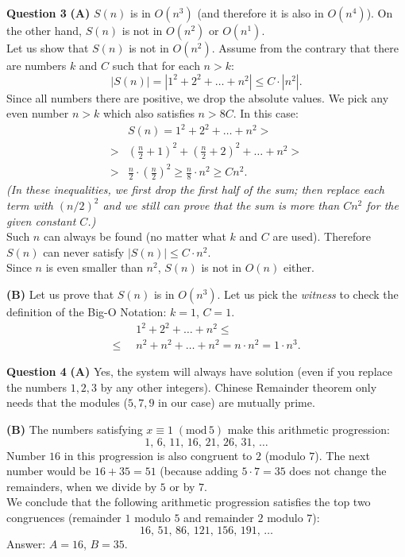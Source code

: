 \documentclass[jou]{apa6}
\begin{document}
\vspace{10pt}
{\bf Question 3}
{\bf (A)} $S(n)$ is in $O(n^3)$ (and therefore it is also in $O(n^4)$). 
On the other hand, $S(n)$ is not in $O(n^2)$ or $O(n^1)$.\\
Let us show that $S(n)$ is not in $O(n^2)$. Assume from the contrary
that there are numbers $k$ and $C$ such that for each $n > k$:
$$|S(n)| = |1^2 + 2^2 + \ldots + n^2| \leq C \cdot |n^2|.$$
Since all numbers there are positive, we drop the absolute values. 
We pick any even number $n > k$ which also satisfies $n > 8C$. In this case:
\begin{align}
 & S(n) = 1^2 + 2^2 + \ldots + n^2 > \nonumber \\
> & \left( \frac{n}{2} + 1 \right)^2 + \left( \frac{n}{2} + 2 \right)^2 + \ldots + n^2 > \nonumber \\
> & \frac{n}{2} \cdot \left( \frac{n}{2} \right)^2 \geq \frac{n}{8} \cdot n^2 \geq C n^2. \nonumber 
\end{align}
{\em (In these inequalities, we first drop the first half of the sum; 
then replace each term with $(n/2)^2$ and we still can prove that the sum is more than $Cn^2$ 
for the given constant $C$.)}\\
Such $n$ can always be found (no matter what $k$ and $C$ are used). 
Therefore $S(n)$ can never satisfy $|S(n)| \leq C \cdot n^2$.\\
Since $n$ is even smaller than $n^2$, $S(n)$ is not in $O(n)$ either. 

{\bf (B)} Let us prove that $S(n)$ is in $O(n^3)$. 
Let us pick the {\em witness} to check the definition of the Big-O Notation: 
$k = 1$, $C = 1$. 
\begin{align}
     & 1^2 + 2^2 + \ldots + n^2 \leq \nonumber \\
\leq\;\; & n^2 + n^2 + \ldots + n^2=  n \cdot n^2 = 1 \cdot n^3. \nonumber
\end{align}


\vspace{10pt}
{\bf Question 4}
{\bf (A)} Yes, the system will always have solution (even if you replace the numbers $1,2,3$ by 
any other integers). Chinese Remainder theorem only needs that the modules 
($5,7,9$ in our case) are mutually prime.

{\bf (B)} The numbers satisfying $x \equiv 1\;(\text{mod}\,5)$ make this arithmetic progression: 
$$1,\,6,\,11,\,16,\,21,\,26,\,31,\,\ldots$$
Number $16$ in this progression is also congruent to $2$ (modulo $7$). The next number would be 
$16 + 35 = 51$ (because adding $5 \cdot 7 = 35$ does not change the remainders, when 
we divide by $5$ or by $7$.\\
We conclude that the following arithmetic progression satisfies the top two congruences
(remainder $1$ modulo $5$ and remainder $2$ modulo $7$):
$$16,\,51,\,86,\,121,\,156,\,191,\,\ldots$$
Answer: $A = 16$, $B = 35$. 
\end{document}
